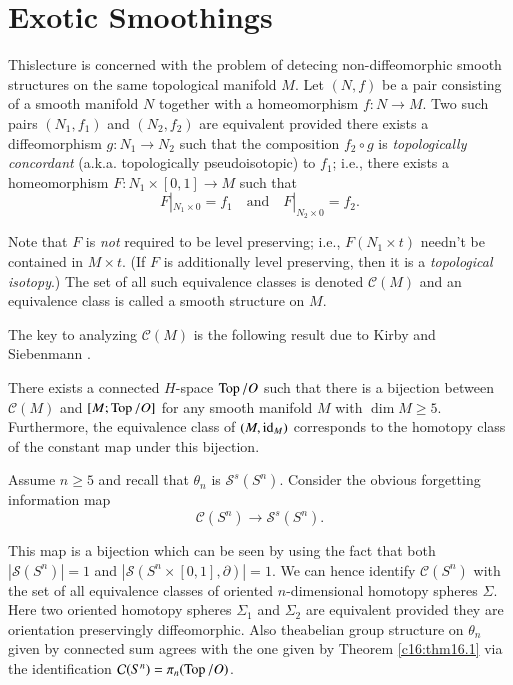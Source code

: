\chapter{Exotic Smoothings}\label{c16}

\setcounter{pageoriginal}{67}
This\pageoriginale lecture is concerned with the problem of detecing
non-diffeomor\-phic smooth structures on the same topological manifold
$M$. Let $(N,f)$ be a pair consisting of a smooth manifold $N$
together with a homeomorphism $f:N\to M$. Two such pairs
$(N_{1},f_{1})$ and $(N_{2},f_{2})$ are equivalent provided there
exists a diffeomorphism $g:N_{1}\to N_{2}$ such that the composition
$f_{2}\circ g$ is {\em topologically concordant} (a.k.a.\@
topologically pseudoisotopic) to $f_{1}$; i.e., there exists a
homeomorphism $F:N_{1}\times [0,1]\to M$ such that
$$
F|_{N_{1}\times 0}=f_{1}\quad\text{and}\quad F|_{N_{2}\times 0}=f_{2}.
$$

Note that $F$ is {\em not} required to be level preserving; i.e.,
$F(N_{1}\times t)$ needn't be contained in $M\times t$. (If $F$ is
additionally level preserving, then it is a {\em topological
  isotopy}.) The set of all such equivalence classes is denoted
$\mathcal{C}(M)$ and an equivalence class is called a smooth structure
on $M$.

The key to analyzing $\mathcal{C}(M)$ is the following result due to
Kirby and Siebenmann \cite[p. 194]{67}.

\begin{thm}\label{c16:thm16.1}
There exists a connected $H$-space $\operatorname{Top}/O$ such that there is a
bijection between $\mathcal{C}(M)$ and $[M;\operatorname{Top}/O]$ for any smooth
manifold $M$ with $\dim M\geq 5$. Furthermore, the equivalence class
of $(M,\operatorname{id}_{M})$ corresponds to the homotopy class of the constant map
under this bijection.
\end{thm}

Assume $n\geq 5$ and recall that $\theta_{n}$ is
$\mathcal{S}^{s}(S^{n})$. Consider the obvious forgetting information map
$$
\mathcal{C}(S^{n})\to \mathcal{S}^{s}(S^{n}).
$$

This map is a bijection which can be seen by using the fact that both
$|\mathcal{S}(S^{n})|=1$ and
$|\mathcal{S}(S^{n}\times[0,1],\partial)|=1$. We can hence identify
$\mathcal{C}(S^{n})$ with the set of all equivalence classes of
oriented $n$-dimensional homotopy spheres $\Sigma$. Here two oriented
homotopy spheres $\Sigma_{1}$ and $\Sigma_{2}$ are equivalent provided
they are orientation preservingly diffeomorphic. Also
the\pageoriginale abelian group structure on $\theta_{n}$ given by
connected sum agrees with the one given by Theorem \ref{c16:thm16.1}
via the identification $\mathcal{C}(S^{n})=\pi_{n}(\operatorname{Top}/O)$. 

